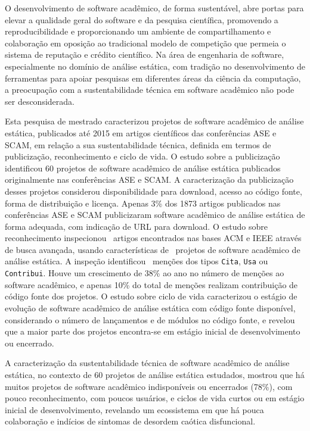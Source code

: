 \label{conclusoes}

O desenvolvimento de software acadêmico, de forma sustentável,
abre portas para elevar a qualidade geral do software e
da pesquisa científica, promovendo a reproducibilidade e
proporcionando um ambiente de compartilhamento e colaboração 
em oposição ao tradicional modelo de competição que permeia
o sistema de reputação e crédito científico.
%
Na área de engenharia de software, 
especialmente no domínio de análise estática,
com tradição no desenvolvimento de ferramentas para apoiar pesquisas
em diferentes áreas da ciência da computação,
a preocupação com a sustentabilidade técnica em software acadêmico
não pode ser desconsiderada. 

Esta pesquisa de mestrado caracterizou
projetos de software acadêmico de análise estática,
publicados até 2015 em artigos científicos das conferências ASE e SCAM,
em relação a sua sustentabilidade técnica, definida
em termos de publicização, reconhecimento e ciclo de vida.
%
O estudo sobre a publicização
identificou 60 projetos de software acadêmico de análise estática
publicados originalmente nas conferências ASE e SCAM.
A caracterização da publicização desses projetos considerou
disponibilidade para download, acesso ao código fonte, forma de distribuição e licença.
Apenas 3\% dos 1873 artigos publicados nas conferências ASE e SCAM 
publicizaram software acadêmico de análise estática de forma adequada,
com indicação de URL para download.
%
O estudo sobre reconhecimento 
inspecionou \SearchUniqueCount \ artigos encontrados nas bases ACM
e IEEE através de busca avançada, 
usando características de \SoftwareCount \ projetos 
de software acadêmico de análise estática. 
A inspeção identificou  \ScreeningCount \ menções 
dos tipos \texttt{Cita}, \texttt{Usa} ou \texttt{Contribui}.
Houve um crescimento de 38\% ao ano no número de menções ao software acadêmico, 
e apenas 10\% do total de menções realizam contribuição de código fonte dos
projetos.
%
O estudo sobre ciclo de vida
caracterizou o estágio de evolução de software acadêmico de análise estática
com código fonte disponível,
considerando o número de lançamentos e de módulos no código fonte,
e revelou que a maior parte dos projetos encontra-se 
em estágio inicial de desenvolvimento ou encerrado.

A caracterização da sustentabilidade técnica de 
software acadêmico de análise estática, no contexto de 
60 projetos de análise estática estudados, mostrou que 
há muitos projetos de software acadêmico indisponíveis ou encerrados (78\%), 
com pouco reconhecimento, com poucos usuários, 
e ciclos de vida curtos ou em estágio inicial de desenvolvimento,
revelando um ecossistema em que há pouca colaboração
e indícios de sintomas de desordem caótica disfuncional.

